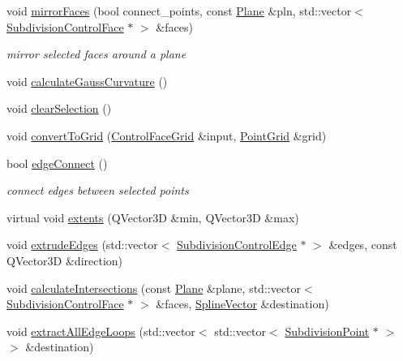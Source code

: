 \begin{DoxyCompactItemize}
void \hyperlink{classShipCAD_1_1SubdivisionSurface_aa4373fbdac959c595f7ef08da4d5ad60}{mirror\+Faces} (bool connect\+\_\+points, const \hyperlink{classShipCAD_1_1Plane}{Plane} \&pln, std\+::vector$<$ \hyperlink{classShipCAD_1_1SubdivisionControlFace}{Subdivision\+Control\+Face} $\ast$ $>$ \&faces)
\begin{DoxyCompactList}\small\item\em mirror selected faces around a plane \end{DoxyCompactList}\item 
void \hyperlink{classShipCAD_1_1SubdivisionSurface_a3aa7c4fd1fa84170a59e6c0549573c92}{calculate\+Gauss\+Curvature} ()
\item 
void \hyperlink{classShipCAD_1_1SubdivisionSurface_a2a984cc9ae8c78153113552cfb6321d5}{clear\+Selection} ()
\item 
void \hyperlink{classShipCAD_1_1SubdivisionSurface_a6049cf9c53f06eb02fd34cdc0653cbfd}{convert\+To\+Grid} (\hyperlink{structShipCAD_1_1ControlFaceGrid}{Control\+Face\+Grid} \&input, \hyperlink{structShipCAD_1_1PointGrid}{Point\+Grid} \&grid)
\item 
bool \hyperlink{classShipCAD_1_1SubdivisionSurface_a227aca20493edc1f3ae0039804dd693c}{edge\+Connect} ()
\begin{DoxyCompactList}\small\item\em connect edges between selected points \end{DoxyCompactList}\item 
virtual void \hyperlink{classShipCAD_1_1SubdivisionSurface_abc1cf0168290242dfbe5dd0d178fa7cb}{extents} (Q\+Vector3D \&min, Q\+Vector3D \&max)
\item 
void \hyperlink{classShipCAD_1_1SubdivisionSurface_ac19570e1402deab738d2231d6bec9650}{extrude\+Edges} (std\+::vector$<$ \hyperlink{classShipCAD_1_1SubdivisionControlEdge}{Subdivision\+Control\+Edge} $\ast$ $>$ \&edges, const Q\+Vector3D \&direction)
\item 
void \hyperlink{classShipCAD_1_1SubdivisionSurface_a9fa189058cbdc190d8847c976fd4ae06}{calculate\+Intersections} (const \hyperlink{classShipCAD_1_1Plane}{Plane} \&plane, std\+::vector$<$ \hyperlink{classShipCAD_1_1SubdivisionControlFace}{Subdivision\+Control\+Face} $\ast$ $>$ \&faces, \hyperlink{namespaceShipCAD_a053b941b2c87049bb9380428d4d5a056}{Spline\+Vector} \&destination)
\item 
void \hyperlink{classShipCAD_1_1SubdivisionSurface_a17dccf4965b49427d345bd5acce897c5}{extract\+All\+Edge\+Loops} (std\+::vector$<$ std\+::vector$<$ \hyperlink{classShipCAD_1_1SubdivisionPoint}{Subdivision\+Point} $\ast$ $>$ $>$ \&destination)

\end{DoxyCompactItemize}

